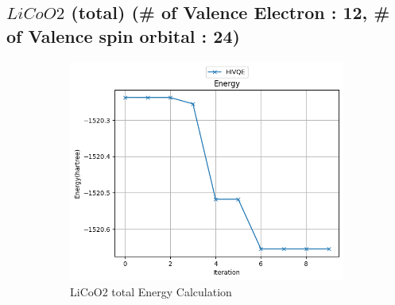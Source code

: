 \documentclass[11pt]{article}
\begin{document}
\subsection{\(LiCoO2\) (total) (\# of Valence Electron : 12, \# of Valence spin orbital : 24)}
\begin{figure}[H]
  \centering
  \begin{subfigure}[b]{0.6\textwidth}
    \includegraphics[width=\textwidth]{fig/LiCoO2_tot.png}
    \caption{LiCoO2 total Energy Calculation}
    \label{fig:first}
  \end{subfigure}
  \hfill
  \vrule width 1pt  %
  \hfill
  \begin{subfigure}[b]{0.3\textwidth}

\end{subfigure}
\end{figure}
\end{document}
